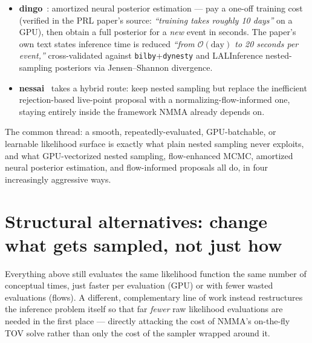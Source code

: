 \documentclass[11pt]{article}
\newcommand{\code}[1]{\texttt{#1}}
\begin{document}
\begin{itemize}[leftmargin=1.4em]
\textbf{$14.8\times$} (11D) --- the speedup \emph{grows} with dimensionality, the opposite of
nested sampling's usual scaling, and exactly the regime NMMA's joint high-dimensional
parametrizations live in.
\item \textbf{dingo}~\cite{Dax:2021tsq,Dax:2022pxd}: amortized neural posterior estimation
--- pay a one-off training cost (verified in the PRL paper's source: \emph{``training takes
roughly 10 days''} on a GPU), then obtain a full posterior for a \emph{new} event in seconds.
The paper's own text states inference time is reduced \emph{``from $\mathcal{O}(\text{day})$
to 20 seconds per event,''} cross-validated against \code{bilby}+\code{dynesty} and
LALInference nested-sampling posteriors via Jensen--Shannon divergence.
\item \textbf{nessai}~\cite{Williams:2021qyt,Williams:2023ppp} takes a hybrid route: keep
nested sampling but replace the inefficient rejection-based live-point proposal with a
normalizing-flow-informed one, staying entirely inside the framework NMMA already depends on.
\end{itemize}

The common thread: a smooth, repeatedly-evaluated, GPU-batchable, or learnable likelihood
surface is exactly what plain nested sampling never exploits, and what GPU-vectorized nested
sampling, flow-enhanced MCMC, amortized neural posterior estimation, and flow-informed
proposals all do, in four increasingly aggressive ways.

\section{Structural alternatives: change what gets sampled, not just how}
\label{sec:structural}

Everything above still evaluates the same likelihood function the same number of
conceptual times, just faster per evaluation (GPU) or with fewer wasted evaluations (flows).
A different, complementary line of work instead restructures the inference problem itself so
that far \emph{fewer} raw likelihood evaluations are needed in the first place --- directly
attacking the cost of NMMA's on-the-fly TOV solve rather than only the cost of the sampler
wrapped around it.
\end{document}
